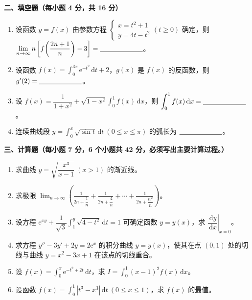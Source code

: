 \documentclass[a4paper,11pt]{ctexart}
\newcommand{\dd}{\,\mathrm{d}}
\newcommand{\e}{\mathrm{e}}
\newcommand{\blank}[1][2.2cm]{\underline{\hspace{#1}}}
\begin{document}
\newpage

\textbf{二、填空题（每小题 4 分，共 16 分）}

\begin{enumerate}[label=\arabic*., start=7, leftmargin=2em, itemsep=0.4em, topsep=0.3em]
  \item 设函数 $y=f(x)$ 由参数方程 $\begin{cases}x=t^2+1\\ y=4t-t^2\end{cases}(t\ge 0)$ 确定，\newline 则 $\displaystyle\lim_{n\to\infty}n\left[f\!\left(\frac{2n+1}{n}\right)-3\right]=\blank$。

  \item 设函数 $f(x)=\displaystyle\int_0^{3x}\e^{-t^2}\dd t+2$，$g(x)$ 是 $f(x)$ 的反函数，则 $g'(2)=\blank$。

  \item 设 $f(x)=\dfrac{1}{1+x^2}+\sqrt{1-x^2}\displaystyle\int_0^1 f(x)\dd x$，则 $\displaystyle\int_0^1 f(x)\dd x=\blank$。

  \item 连续曲线段 $y=\displaystyle\int_0^x\sqrt{\sin t}\dd t\ (0\le x\le\pi)$ 的弧长为 $\blank$。
\end{enumerate}

\vspace{0.35em}

\textbf{三、计算题（每小题 7 分，6 个小题共 42 分，必须写出主要计算过程。）}

\begin{enumerate}[label=\arabic*., start=11, leftmargin=2em, itemsep=0.4em, topsep=0.3em]
  \item 求曲线 $y=\sqrt{\dfrac{x^3}{x-1}}\ (x>1)$ 的渐近线。

  \item 求极限 $\displaystyle\lim_{n\to\infty}\left(\frac{1}{2n+\dfrac{1}{n}}+\frac{1}{2n+\dfrac{4}{n}}+\cdots+\frac{1}{2n+\dfrac{n^2}{n}}\right)$。

  \item 设方程 $\e^{xy}+\dfrac{1}{\sqrt{3}}\displaystyle\int_1^y\sqrt{4-t^2}\dd t=1$ 可确定函数 $y=y(x)$，求 $\left.\dfrac{\dd y}{\dd x}\right|_{x=0}$。

  \item 求方程 $y''-3y'+2y=2\e^x$ 的积分曲线 $y=y(x)$，使其在点 $(0,1)$ 处的切线与曲线 $y=x^2-3x+1$ 在该点的切线重合。

  \item 设 $f(x)=\displaystyle\int_0^x\e^{-t^2+2t}\dd t$，求 $I=\displaystyle\int_0^1(x-1)^2 f(x)\dd x$。

  \item 设函数 $f(x)=\displaystyle\int_0^1|t^3-x^3|\dd t\ (0\le x\le 1)$，求 $f(x)$ 的最值。
\end{enumerate}
\end{document}
